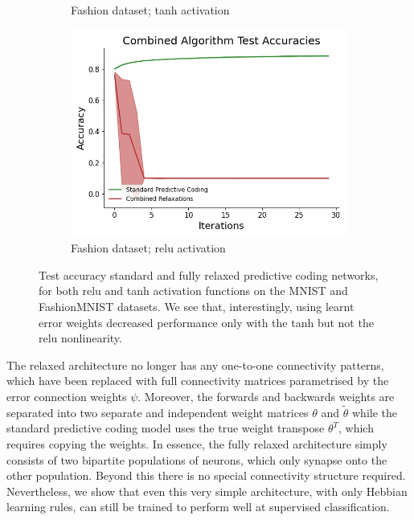 \begin{figure}[ht]
\begin{subfigure}[b]{0.5\linewidth}
    \caption{\small Fashion dataset; tanh activation} 
  \end{subfigure}%
  \begin{subfigure}[b]{0.5\linewidth}
    \centering
    \includegraphics[width=0.75\linewidth]{chapter_3_figures/fashion_relu_Combined_Algorithm_Test_Accuracies_prelim_2.jpg} 
    \caption{\small Fashion dataset; relu activation} 
  \end{subfigure} 
  \caption{Test accuracy standard and fully relaxed predictive coding networks, for both relu and tanh activation functions on the MNIST and FashionMNIST datasets. We see that, interestingly, using learnt error weights decreased performance only with the tanh but not the relu nonlinearity.}
\end{figure} 

The relaxed architecture no longer has any one-to-one connectivity patterns, which have been replaced with full connectivity matrices parametrised by the error connection weights $\psi$. Moreover, the forwards and backwards weights are separated into two separate and independent weight matrices $\theta$ and $\tilde{\theta}$ while the standard predictive coding model uses the true weight transpose $\theta^T$, which requires copying the weights. In essence, the fully relaxed architecture simply consists of two bipartite populations of neurons, which only synapse onto the other population. Beyond this there is no special connectivity structure required. Nevertheless, we show that even this very simple architecture, with only Hebbian learning rules, can still be trained to perform well at supervised classification.

